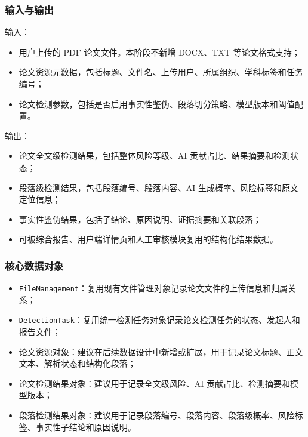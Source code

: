 \subsubsection{输入与输出}
输入：
\begin{itemize}[leftmargin=2em]
    \item 用户上传的 PDF 论文文件。本阶段不新增 DOCX、TXT 等论文格式支持；
    \item 论文资源元数据，包括标题、文件名、上传用户、所属组织、学科标签和任务编号；
    \item 论文检测参数，包括是否启用事实性鉴伪、段落切分策略、模型版本和阈值配置。
\end{itemize}

输出：
\begin{itemize}[leftmargin=2em]
    \item 论文全文级检测结果，包括整体风险等级、AI 贡献占比、结果摘要和检测状态；
    \item 段落级检测结果，包括段落编号、段落内容、AI 生成概率、风险标签和原文定位信息；
    \item 事实性鉴伪结果，包括子结论、原因说明、证据摘要和关联段落；
    \item 可被综合报告、用户端详情页和人工审核模块复用的结构化结果数据。
\end{itemize}

\subsubsection{核心数据对象}
\begin{itemize}[leftmargin=2em]
    \item \texttt{FileManagement}：复用现有文件管理对象记录论文文件的上传信息和归属关系；
    \item \texttt{DetectionTask}：复用统一检测任务对象记录论文检测任务的状态、发起人和报告文件；
    \item 论文资源对象：建议在后续数据设计中新增或扩展，用于记录论文标题、正文文本、解析状态和结构化段落；
    \item 论文检测结果对象：建议用于记录全文级风险、AI 贡献占比、检测摘要和模型版本；
    \item 段落检测结果对象：建议用于记录段落编号、段落内容、段落级概率、风险标签、事实性子结论和原因说明。
\end{itemize}

